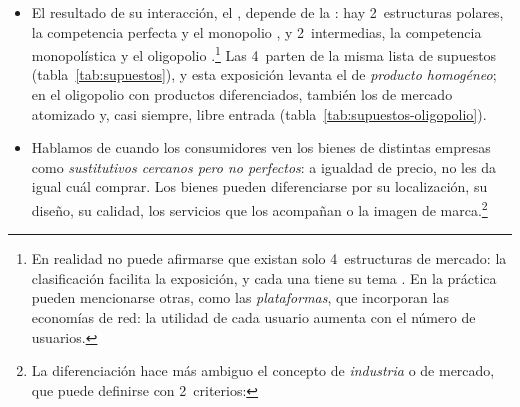\documentclass[11pt]{article}
\begin{document}
\begin{itemize}
\begin{itemize}
{\begin{itemize}
\item la economía de la información de .
\end{itemize}
Los 2~recibieron el Premio Nobel:  en 1982, «por sus estudios pioneros de las estructuras industriales, el funcionamiento de los mercados y las causas y los efectos de la regulación pública»\nocite{Nobel1982Stigler}, y  en 1992, «por haber extendido el dominio del análisis microeconómico a un amplio abanico de comportamientos e interacciones humanos, incluido el comportamiento fuera del mercado»\nocite{Nobel1992Becker}.}
    \begin{itemize}
    \item los consumidores eligen qué consumir sujetos a su restricción presupuestaria;
    \item y los productores transforman factores en productos con restricciones técnicas , de costes  y organizativas y de mercado  .
    \end{itemize}
  \item El resultado de su interacción, el , depende de la : hay 2~estructuras polares, la competencia perfecta  y el monopolio , y 2~intermedias, la competencia monopolística y el oligopolio .\footnote{En realidad no puede afirmarse que existan solo 4~estructuras de mercado: la clasificación facilita la exposición, y cada una tiene su tema   . En la práctica pueden mencionarse otras, como las \emph{plataformas}, que incorporan las economías de red: la utilidad de cada usuario aumenta con el número de usuarios.} Las 4~parten de la misma lista de supuestos (tabla~\ref{tab:supuestos}), y esta exposición levanta el de \emph{producto homogéneo}; en el oligopolio con productos diferenciados, también los de mercado atomizado y, casi siempre, libre entrada (tabla~\ref{tab:supuestos-oligopolio}).
  \item Hablamos de  cuando los consumidores ven los bienes de distintas empresas como \emph{sustitutivos cercanos pero no perfectos}: a igualdad de precio, no les da igual cuál comprar\nocite{Tirole1988Theory}. Los bienes pueden diferenciarse por su localización, su diseño, su calidad, los servicios que los acompañan o la imagen de marca.\footnote{La diferenciación hace más ambiguo el concepto de \emph{industria} o de mercado, que puede definirse con 2~criterios:
}
\end{itemize}
\end{itemize}
\end{document}
